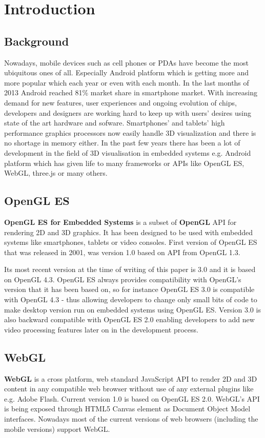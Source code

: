 \documentclass[a4paper,12pt]{article}
\begin{document}

\section{Introduction}

\subsection{Background}
Nowadays, mobile devices such as cell phones or PDAs have become the most ubiquitous ones of all.
Especially Android platform which is getting more and more popular which each year or even with each month.
In the last months of 2013 Android reached 81\% market share in smartphone market. 
With increasing demand for new features, user experiences and ongoing evolution of chips,  developers and designers are working hard to keep up with users' desires using state of the art hardware and sofware.
Smartphones’ and tablets’ high performance graphics processors now easily handle 3D visualization and there is no shortage in memory either. 
In the past few years there has been a lot of development in the field of 3D visualisation in embedded systems e.g. Android platform which has given life to many frameworks or APIs like OpenGL ES, WebGL, three.js or many others.

\subsection{OpenGL ES}
\textbf{OpenGL ES for Embedded Systems} \cite{opengles_kronos} is a subset of \textbf{OpenGL} \cite{opengl_kronos} API for rendering 2D and 3D graphics.
It has been designed to be used with embedded systems like smartphones, tablets or video consoles.
First version of OpenGL ES that was released in 2001, was version 1.0 based on API from OpenGL 1.3.

Its most recent version at the time of writing of this paper is 3.0 and it is based on OpenGL 4.3. 
OpenGL ES always provides compatibility with OpenGL's version that it has been based on, so for instance OpenGL ES 3.0 is compatible with OpenGL 4.3 - thus allowing developers to change only small bits of code to make desktop version run on embedded systems using OpenGL ES.
Version 3.0 is also backward compatible with OpenGL ES 2.0 enabling developers to add new video processing features later on in the development process.

\subsection{WebGL}
\textbf{WebGL} \cite{webgl_kronos} is a cross platform, web standard JavaScript API to render 2D and 3D content in any compatible web browser without use of any external plugins like e.g. Adobe Flash.
Current version 1.0 is based on OpenGL ES 2.0. WebGL's API is being exposed through HTML5 Canvas element as Document Object Model interfaces.
Nowadays most of the current versions of web browsers (including the mobile versions) support WebGL.
\end{document}
